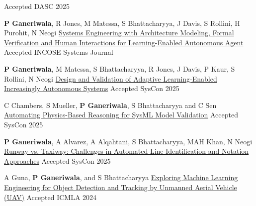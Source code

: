 \begin{cventries}
{Accepted}
{DASC 2025} 
{ %
\begin{cvitems}
\end{cvitems}
}
\cventry
{\textbf{P Ganeriwala}, R Jones, M Matessa, S Bhattacharyya, J Davis, S Rollini, H Purohit, N Neogi}
{\href{https://incose.onlinelibrary.wiley.com/doi/10.1002/sys.21816?af=R}{Systems Engineering with Architecture Modeling, Formal Verification and Human Interactions for Learning-Enabled Autonomous Agent}}
{Accepted}
{INCOSE Systems Journal} 
{ %
\begin{cvitems}
\end{cvitems}
}
\cventry
{\textbf{P Ganeriwala}, M Matessa, S Bhattacharyya, R Jones, J Davis, P Kaur, S Rollini, N Neogi}
{\href{https://ieeexplore.ieee.org/document/11014784}{Design and Validation of Adaptive Learning-Enabled Increasingly Autonomous Systems}}
{Accepted}
{SysCon 2025} 
{ %
\begin{cvitems}
\end{cvitems}
}
\cventry
{C Chambers, S Mueller, \textbf{P Ganeriwala}, S Bhattacharyya and C Sen}
{\href{https://ieeexplore.ieee.org/document/11014788}{Automating Physics-Based Reasoning for SysML Model Validation}}
{Accepted}
{SysCon 2025} 
{ %
\begin{cvitems}
\end{cvitems}
}
\cventry
{\textbf{P Ganeriwala}, A Alvarez, A Alqahtani, S Bhattacharyya, MAH Khan, N Neogi}
{\href{https://ieeexplore.ieee.org/document/11014782}{Runway vs. Taxiway: Challenges in Automated Line Identification and Notation Approaches}}
{Accepted}
{SysCon 2025} 
{ %
\begin{cvitems}
\end{cvitems}
}
\cventry
{A Guna, \textbf{P Ganeriwala}, and S Bhattacharyya}
{\href{https://ieeexplore.ieee.org/document/10903281}{Exploring Machine Learning Engineering for Object Detection and Tracking by Unmanned Aerial Vehicle (UAV)}}
{Accepted}
{ICMLA 2024} 
{ %
\begin{cvitems}

\end{cvitems}}
\end{cventries}
